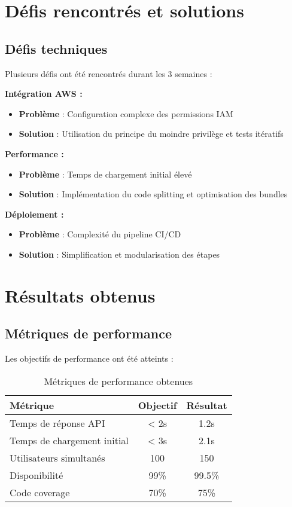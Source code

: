 \section{Défis rencontrés et solutions}

\subsection{Défis techniques}

Plusieurs défis ont été rencontrés durant les 3 semaines :

\textbf{Intégration AWS :}
\begin{itemize}
    \item \textbf{Problème} : Configuration complexe des permissions IAM
    \item \textbf{Solution} : Utilisation du principe du moindre privilège et tests itératifs
\end{itemize}

\textbf{Performance :}
\begin{itemize}
    \item \textbf{Problème} : Temps de chargement initial élevé
    \item \textbf{Solution} : Implémentation du code splitting et optimisation des bundles
\end{itemize}

\textbf{Déploiement :}
\begin{itemize}
    \item \textbf{Problème} : Complexité du pipeline CI/CD
    \item \textbf{Solution} : Simplification et modularisation des étapes
\end{itemize}

\section{Résultats obtenus}

\subsection{Métriques de performance}

Les objectifs de performance ont été atteints :

\begin{table}[H]
\centering
\caption{Métriques de performance obtenues}
\begin{tabular}{|l|c|c|}
\hline
\textbf{Métrique} & \textbf{Objectif} & \textbf{Résultat} \\
\hline
Temps de réponse API & < 2s & 1.2s \\
\hline
Temps de chargement initial & < 3s & 2.1s \\
\hline
Utilisateurs simultanés & 100 & 150 \\
\hline
Disponibilité & 99\% & 99.5\% \\
\hline
Code coverage & 70\% & 75\% \\
\hline
\end{tabular}
\end{table}

